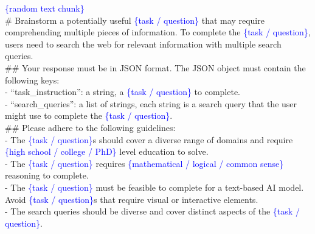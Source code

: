 \documentclass{article}
\begin{document}
\begin{prompt}[title={Prompt: Instruction Generation}, label=prompt:instruction_generation]
\textcolor{blue}{\{random text chunk\}}\\

\# Brainstorm a potentially useful \textcolor{blue}{\{task / question\}} that may require comprehending multiple pieces of information. To complete the \textcolor{blue}{\{task / question\}}, users need to search the web for relevant information with multiple search queries.\\

\#\# Your response must be in JSON format. The JSON object must contain the following keys:\\
\hspace*{1em}- ``task\_instruction'': a string, a \textcolor{blue}{\{task / question\}} to complete.\\
\hspace*{1em}- ``search\_queries'': a list of strings, each string is a search query that the user might use to complete the \textcolor{blue}{\{task / question\}}.\\

\#\# Please adhere to the following guidelines:\\
\hspace*{1em}- The \textcolor{blue}{\{task / question\}}s should cover a diverse range of domains and require \textcolor{blue}{\{high school / college / PhD\}} level education to solve.\\
\hspace*{1em}- The \textcolor{blue}{\{task / question\}} requires \textcolor{blue}{\{mathematical / logical / common sense\}} reasoning to complete.\\
\hspace*{1em}- The \textcolor{blue}{\{task / question\}} must be feasible to complete for a text-based AI model. Avoid \textcolor{blue}{\{task / question\}}s that require visual or interactive elements.\\
\hspace*{1em}- The search queries should be diverse and cover distinct aspects of the \textcolor{blue}{\{task / question\}}.\\


\end{prompt}
\end{document}
